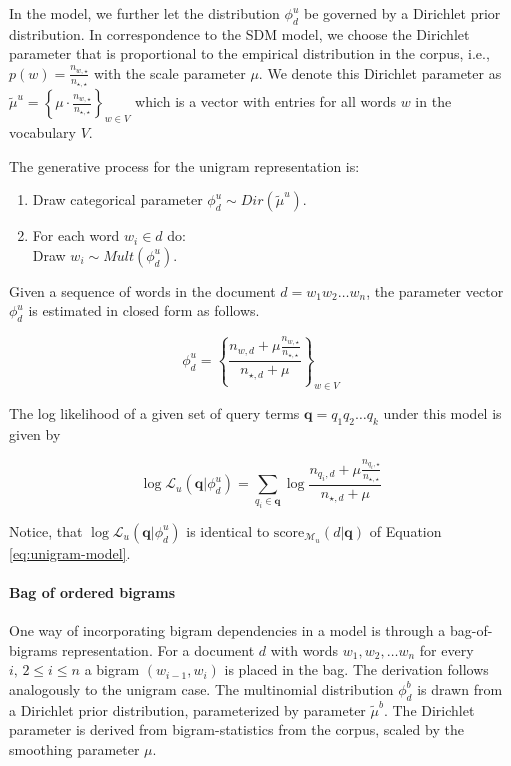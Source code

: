 \documentclass[]{article}
\begin{document}
In the model, we further let the distribution $\phi_{d}^{u}$ be governed
by a Dirichlet prior distribution. In correspondence to the SDM model,
we choose the Dirichlet parameter that is proportional to the empirical
distribution in the corpus, i.e., $p(w)=\frac{n_{w,\star}}{n_{\star,\star}}$
with the scale parameter $\mu$. We denote this Dirichlet parameter
as $\tilde{\mu}^{u}=\left\{ \mu\cdot\frac{n_{w,\star}}{n_{\star,\star}}\right\} _{w\in V}$
which is a vector with entries for all words $w$ in the vocabulary
$V$.

The generative process for the unigram representation is:
\begin{enumerate}
\item Draw categorical parameter $\phi_{d}^{u}\sim Dir(\tilde{\mu}^{u})$.
\item For each word $w_{i}\in d$ do: \\
Draw $w_{i}\sim Mult(\phi_{d}^{u})$.
\end{enumerate}
Given a sequence of words in the document $d=w_{1}w_{2}\dots w_{n}$,
the parameter vector $\phi_{d}^{u}$ is estimated in closed form as
follows.

\[
\phi_{d}^{u}=\left\{ \frac{n_{w,d}+\mu\frac{n_{w,\star}}{n_{\star,\star}}}{n_{\star,d}+\mu}\right\} _{w\in V}
\]

The log likelihood of a given set of query terms $\mathbf{q}=q_{1}q_{2}\dots q_{k}$
under this model is given by

\[
\log\mathcal{L}_{u}(\mathbf{q}|\phi_{d}^{u})=\sum_{q_{i}\in\mathbf{q}}\log\frac{n_{q_{i},d}+\mu\frac{n_{q_{i},\star}}{n_{\star,\star}}}{n_{\star,d}+\mu}
\]

Notice, that $\log\mathcal{L}_{u}(\mathbf{q}|\phi_{d}^{u})$ is identical
to $\mbox{score}_{\mathcal{M}_{u}}(d|\mathbf{q})$ of Equation \ref{eq:unigram-model}. 

\paragraph{Bag of ordered bigrams}

One way of incorporating bigram dependencies in a model is through
a bag-of-bigrams representation. For a document $d$ with words $w_{1},w_{2},\dots w_{n}$
for every $i,\,2\leq i\leq n$ a bigram $(w_{i-1},w_{i})$ is placed
in the bag. The derivation follows analogously to the unigram case.
The multinomial distribution $\phi_{d}^{b}$ is drawn from a Dirichlet
prior distribution, parameterized by parameter $\tilde{\mu}^{b}$.
The Dirichlet parameter is derived from bigram-statistics from the
corpus, scaled by the smoothing parameter $\mu$.
\end{document}
